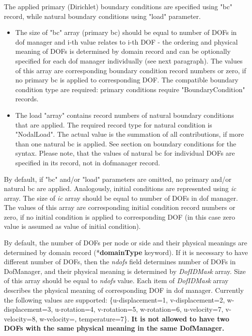 \documentclass[a4paper]{article}
\newcommand{\param}[1]{{\em #1}}
\newcommand{\entKeyword}[1]{\mbox{{*{\bf{#1}}}}}
\begin{document}
The applied primary (Dirichlet) boundary conditions are specified using
"bc" record, while natural boundary conditions using "load" parameter.
\begin{itemize}
\item The size of "bc" array (primary bc) should be equal to number of DOFs in dof manager and i-th value relates to i-th DOF - the ordering and physical meaning of DOFs is determined by domain record and can be optionally specified for each dof manager individually (see next paragraph). The values of this array are corresponding boundary condition record numbers or zero, if no primary bc is applied to corresponding DOF. The compatible boundary condition type are required: primary conditions require "BoundaryCondition" records.
\item The load "array" contains record numbers of natural boundary conditions that are applied. The required record type for natural condition is "NodalLoad". The actual value is the summation of all contributions, if more than one natural bc is applied. See section on boundary conditions for the syntax. Please note, that the values of natural bc for individual DOFs are specified in its record, not in dofmanager record.
\end{itemize}

By default, if "bc" and/or "load" parameters are omitted, no primary
and/or natural bc are applied. Analogously, initial conditions are represented using \param{ic} array. The size of \param{ic} array should be equal to number of DOFs in dof manager. The values of this array are corresponding initial condition record numbers or zero, if no initial condition is applied to corresponding DOF (in this case zero value is assumed as value of initial condition).

By default, the number of DOFs per node or side  and their physical meanings are determined by domain record (\entKeyword{domainType} keyword).
If it is necessary to have
different number of DOFs, then the \param{ndofs} field
determines number of DOFs in DofManager, and their physical meaning is
determined by \param{DofIDMask} array. Size of this array
should be equal to \param{ndofs} value. Each item of \param{DofIDMask}
array describes the physical meaning of corresponding DOF in dof manager. Currently
the following values are supported: \{u-displacement=1, v-displacement=2,
 w-displacement=3, u-rotation=4, v-ro\-ta\-tion=5, w-rotation=6, u-velocity=7, v-velocity=8, w-velocity=,
temperature=7\}. {\bf It is not allowed to have two DOFs
with the same physical meaning in the same DofManager.}
\end{document}
